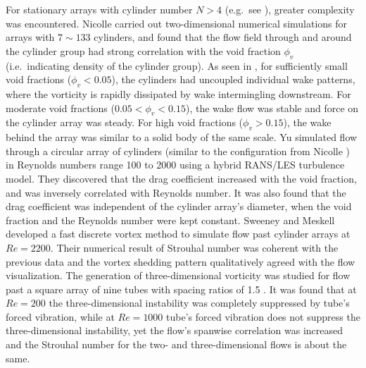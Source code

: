 For stationary arrays with cylinder number $N >4 $ (e.g.\ see ), greater complexity was encountered. Nicolle \etal{} \cite{Nicolle2011} carried out two-dimensional numerical simulations for arrays with $ 7 \sim 133 $ cylinders, and found that the flow field through and around the cylinder group had strong correlation with the void fraction $ \phi_v $ (i.e.\ indicating density of the cylinder group). As seen in , for sufficiently small void fractions ($ \phi_v <0.05$), the cylinders had uncoupled individual wake patterns, where the vorticity is rapidly dissipated by wake intermingling downstream. For moderate void fractions ($ 0.05< \phi_v <0.15$), the wake flow was stable and force on the cylinder array was steady. For high void fractions ($ \phi_v >0.15$), the wake behind the array was similar to a solid body of the same scale. Yu \etal{} \cite{Yu2013} simulated flow through a circular array of cylinders (similar to the configuration from Nicolle \cite{Nicolle2011}) in Reynolds numbers range 100 to 2000 using a hybrid RANS/LES turbulence model. They discovered that the drag coefficient increased with the void fraction, and was inversely correlated with Reynolds number. It was also found that the drag coefficient was independent of the cylinder array's diameter, when the void fraction and the Reynolds number were kept constant. Sweeney and Meskell \cite{Sweeney2003} developed a fast discrete vortex method to simulate flow past cylinder arrays at $ Re=2200 $. Their numerical result of Strouhal number was coherent with the previous data and the vortex shedding pattern qualitatively agreed with the flow visualization. The generation of three-dimensional vorticity was studied for flow past a square array of nine tubes with spacing ratios of 1.5 \cite{Kevlahan2005}. It was found that at $ Re =200 $ the three-dimensional instability was completely suppressed by tube's forced vibration, while at $ Re =1000 $ tube's forced vibration does not suppress the three-dimensional instability, yet the flow's spanwise correlation was increased and the Strouhal number for the two- and three-dimensional flows is about the same.


